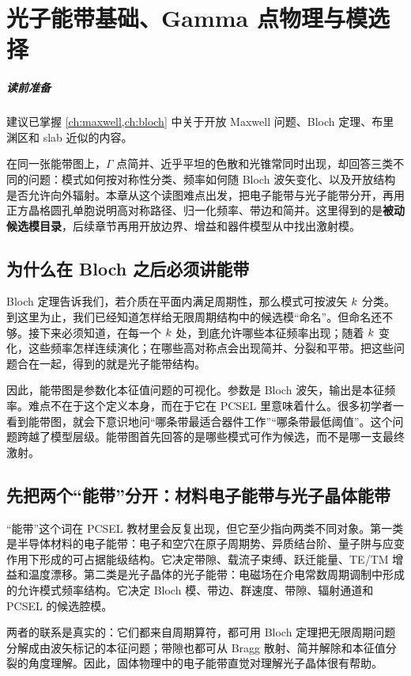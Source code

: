 ﻿%
\chapter{光子能带基础、Gamma 点物理与模选择}
\label{ch:gamma}

\paragraph{读前准备}
建议已掌握 \cref{ch:maxwell,ch:bloch} 中关于开放 Maxwell 问题、Bloch 定理、布里渊区和 slab 近似的内容。

在同一张能带图上，$\Gamma$ 点简并、近乎平坦的色散和光锥常同时出现，却回答三类不同的问题：模式如何按对称性分类、频率如何随 Bloch 波矢变化、以及开放结构是否允许向外辐射。本章从这个读图难点出发，把电子能带与光子能带分开，再用正方晶格圆孔单胞说明高对称路径、归一化频率、带边和简并。这里得到的是\textbf{被动候选模目录}，后续章节再用开放边界、增益和器件模型从中找出激射模。

\section{为什么在 Bloch 之后必须讲能带}
Bloch 定理告诉我们，若介质在平面内满足周期性，那么模式可按波矢 $k$ 分类。到这里为止，我们已经知道怎样给无限周期结构中的候选模“命名”。但命名还不够。接下来必须知道，在每一个 $k$ 处，到底允许哪些本征频率出现；随着 $k$ 变化，这些频率怎样连续演化；在哪些高对称点会出现简并、分裂和平带。把这些问题合在一起，得到的就是光子能带结构。

因此，能带图是参数化本征值问题的可视化。参数是 Bloch 波矢，输出是本征频率。难点不在于这个定义本身，而在于它在 PCSEL 里意味着什么。很多初学者一看到能带图，就会下意识地问“哪条带最适合器件工作”“哪条带最低阈值”。这个问题跨越了模型层级。能带图首先回答的是哪些模式可作为候选，而不是哪一支最终激射。

\section{先把两个“能带”分开：材料电子能带与光子晶体能带}
“能带”这个词在 PCSEL 教材里会反复出现，但它至少指向两类不同对象。第一类是半导体材料的电子能带：电子和空穴在原子周期势、异质结台阶、量子阱与应变作用下形成的可占据能级结构。它决定带隙、载流子束缚、跃迁能量、TE/TM 增益和温度漂移。第二类是光子晶体的光子能带：电磁场在介电常数周期调制中形成的允许模式频率结构。它决定 Bloch 模、带边、群速度、带隙、辐射通道和 PCSEL 的候选腔模。

两者的联系是真实的：它们都来自周期算符，都可用 Bloch 定理把无限周期问题分解成由波矢标记的本征问题；带隙也都可从 Bragg 散射、简并解除和本征值分裂的角度理解。因此，固体物理中的电子能带直觉对理解光子晶体很有帮助。

